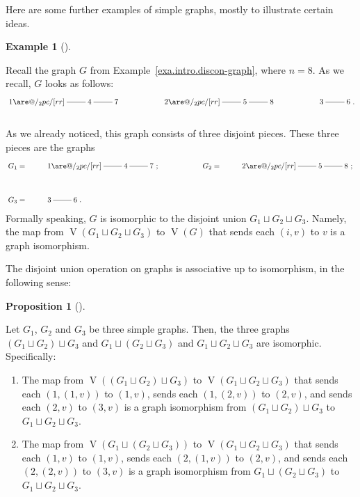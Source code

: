 \documentclass[numbers=enddot,12pt,final,onecolumn,notitlepage]{scrartcl}%
\makeatletter
\theoremstyle{definition}
\newtheorem{prop}[theo]{Proposition}
\newenvironment{proposition}[1][]
{\begin{prop}[#1]\begin{leftbar}}
{\end{leftbar}\end{prop}}
\newtheorem{exam}[theo]{Example}
\newenvironment{example}[1][]
{\begin{exam}[#1]\begin{leftbar}}
{\end{leftbar}\end{exam}}
\newcommand{\tup}[1]{\left( #1 \right)}
\newcommand{\verts}[1]{\operatorname{V}\left( #1 \right)}
\newcommand{\are}{\ar@{-}}
\makeatother
\begin{document}
Here are some further examples of simple graphs, mostly to illustrate
certain ideas.

\begin{example}
Recall the graph $G$ from Example~\ref{exa.intro.discon-graph},
where $n = 8$. As we recall, $G$ looks as follows:
\begin{align*}
\xymatrix{
1 \are@/_2pc/[rr] \are[r] & 4 \are[r] & 7
& &
2 \are@/_2pc/[rr] \are[r] & 5 \are[r] & 8
& &
3 \are[r] & 6
} . \\
\phantom{a} %
\end{align*}
As we already noticed, this graph consists of three disjoint
pieces. These three pieces are the graphs
\begin{align*}
& \xymatrix{
G_1 = & 1 \are@/_2pc/[rr] \are[r] & 4 \are[r] & 7\ ;
& &
G_2 = & 2 \are@/_2pc/[rr] \are[r] & 5 \are[r] & 8\ ;
} \\
& \phantom{\int} %
\\
& \xymatrix{
G_3 = & 3 \are[r] & 6
} .
\end{align*}
Formally speaking, $G$ is isomorphic to the disjoint union
$G_1 \sqcup G_2 \sqcup G_3$. Namely, the map from
$\verts{G_1 \sqcup G_2 \sqcup G_3}$ to $\verts{G}$ that
sends each $\tup{i, v}$ to $v$ is a graph isomorphism.
\end{example}

The disjoint union operation on graphs is associative up
to isomorphism, in the following sense:

\begin{proposition}
\label{prop.djun.ass}
Let $G_1$, $G_2$ and $G_3$ be three simple graphs. Then,
the three graphs
$\tup{G_1 \sqcup G_2} \sqcup G_3$ and
$G_1 \sqcup \tup{G_2 \sqcup G_3}$ and
$G_1 \sqcup G_2 \sqcup G_3$ are isomorphic.
Specifically:

\begin{enumerate}

\item[\textbf{(a)}]
The map from $\verts{\tup{G_1 \sqcup G_2} \sqcup G_3}$
to $\verts{G_1 \sqcup G_2 \sqcup G_3}$ that sends each
$\tup{1, \tup{1, v}}$ to $\tup{1, v}$,
sends each $\tup{1, \tup{2, v}}$ to $\tup{2, v}$,
and sends each $\tup{2, v}$ to $\tup{3, v}$
is a graph isomorphism from
$\tup{G_1 \sqcup G_2} \sqcup G_3$ to
$G_1 \sqcup G_2 \sqcup G_3$.

\item[\textbf{(b)}]
The map from $\verts{G_1 \sqcup \tup{G_2 \sqcup G_3}}$
to $\verts{G_1 \sqcup G_2 \sqcup G_3}$ that sends each
$\tup{1, v}$ to $\tup{1, v}$,
sends each $\tup{2, \tup{1, v}}$ to $\tup{2, v}$,
and sends each $\tup{2, \tup{2, v}}$ to $\tup{3, v}$
is a graph isomorphism from
$G_1 \sqcup \tup{G_2 \sqcup G_3}$ to
$G_1 \sqcup G_2 \sqcup G_3$.

\end{enumerate}

\end{proposition}
\end{document}
